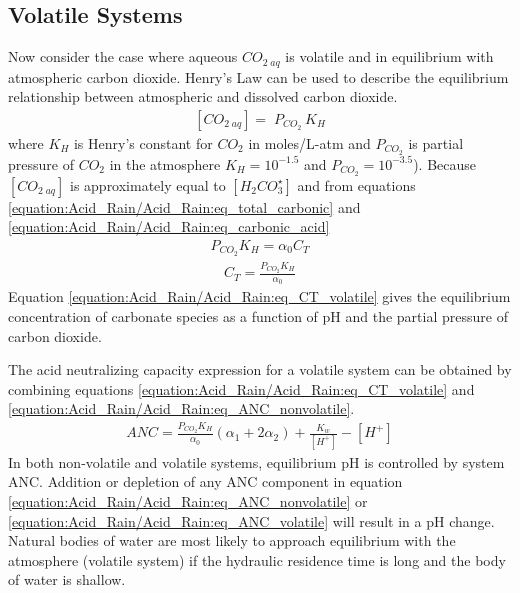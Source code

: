 \documentclass[letterpaper,10pt,english]{sphinxmanual}
\begin{document}
\subsection{Volatile Systems}
\label{\detokenize{Acid_Rain/Acid_Rain:volatile-systems}}
Now consider the case where aqueous \({CO}_{2\; aq}\) is volatile and in equilibrium with atmospheric carbon dioxide. Henry’s Law can be used to describe the equilibrium relationship between atmospheric and dissolved carbon dioxide.
\begin{equation}\label{equation:Acid_Rain/Acid_Rain:Acid_Rain/Acid_Rain:1}
\begin{split}\left[{CO}_{{2\; aq}} \right]={\; P}_{{CO}_{{2}} {\; }} {K}_{{H}}\end{split}
\end{equation}
where \(K_H\) is Henry’s constant for \(CO_2\) in moles/L-atm and \(P_{CO_2}\) is partial pressure of \(CO_2\) in the atmosphere \(K_H = 10^{-1.5}\)  and \(P_{CO_2} = 10^{-3.5}\)). Because \(\left[{CO}_{{2\; aq}} \right]\) is approximately equal to \(\left[H_2CO_3^{\star} \right]\) and from equations \eqref{equation:Acid_Rain/Acid_Rain:eq_total_carbonic} and \eqref{equation:Acid_Rain/Acid_Rain:eq_carbonic_acid}
\begin{equation}\label{equation:Acid_Rain/Acid_Rain:Acid_Rain/Acid_Rain:2}
\begin{split}P_{CO_2} K_H =\alpha_0 C_T\end{split}
\end{equation}\begin{equation}\label{equation:Acid_Rain/Acid_Rain:eq_CT_volatile}
\begin{split}C_T = \frac{P_{CO_2} K_H}{\alpha_0}\end{split}
\end{equation}
Equation \eqref{equation:Acid_Rain/Acid_Rain:eq_CT_volatile} gives the equilibrium concentration of carbonate species as a function of pH and the partial pressure of carbon dioxide.

The acid neutralizing capacity expression for a volatile system can be obtained by combining equations \eqref{equation:Acid_Rain/Acid_Rain:eq_CT_volatile} and \eqref{equation:Acid_Rain/Acid_Rain:eq_ANC_nonvolatile}.
\begin{equation}\label{equation:Acid_Rain/Acid_Rain:eq_ANC_volatile}
\begin{split}ANC=\frac{P_{CO_2} K_H }{\alpha_0 } (\alpha_1 +2\alpha_2 ) + \frac{K_w }{\left[H^+ \right]} - \left[H^+ \right]\end{split}
\end{equation}
In both non-volatile and volatile systems, equilibrium pH is controlled by system ANC. Addition or depletion of any ANC component in equation \eqref{equation:Acid_Rain/Acid_Rain:eq_ANC_nonvolatile} or \eqref{equation:Acid_Rain/Acid_Rain:eq_ANC_volatile} will result in a pH change. Natural bodies of water are most likely to approach equilibrium with the atmosphere (volatile system) if the hydraulic residence time is long and the body of water is shallow.
\end{document}
